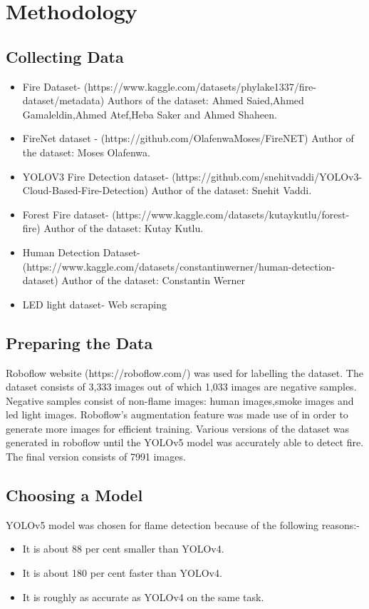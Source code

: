 \documentclass[conference]{IEEEtran}
\begin{document}
\section{Methodology}


\subsection{Collecting Data}\label{AA}
\begin{itemize}
\item Fire Dataset- (https://www.kaggle.com/datasets/phylake1337/fire-dataset/metadata)
Authors of the dataset: Ahmed Saied,Ahmed Gamaleldin,Ahmed Atef,Heba Saker and Ahmed Shaheen.
\item FireNet dataset - (https://github.com/OlafenwaMoses/FireNET) Author of the dataset: Moses Olafenwa.
\item YOLOV3 Fire Detection dataset- (https://github.com/snehitvaddi/YOLOv3-Cloud-Based-Fire-Detection) Author of the dataset: Snehit Vaddi.
\item Forest Fire dataset- (https://www.kaggle.com/datasets/kutaykutlu/forest-fire) Author of the dataset: Kutay Kutlu.
\item Human Detection Dataset- (https://www.kaggle.com/datasets/constantinwerner/human-detection-dataset) Author of the dataset: Constantin Werner
\item LED light dataset- Web scraping
\end{itemize}


\subsection{Preparing the Data}
Roboflow website (https://roboflow.com/) was used for labelling the dataset. The dataset consists of 3,333 images out of which 1,033 images are negative samples. Negative samples consist of non-flame images: human images,smoke images and led light images. Roboflow's augmentation feature was made use of in order to generate more images for efficient training. Various versions of the dataset was generated in roboflow until the YOLOv5 model was accurately able to detect fire. The final version consists of 7991 images.


\subsection{Choosing a Model}
YOLOv5 model was chosen for flame detection because of the following reasons:-
\begin{itemize}
\item It is about 88 per cent smaller than YOLOv4.
\item It is about 180 per cent faster than YOLOv4.
\item It is roughly as accurate as YOLOv4 on the same task.
\end{itemize}
\end{document}
